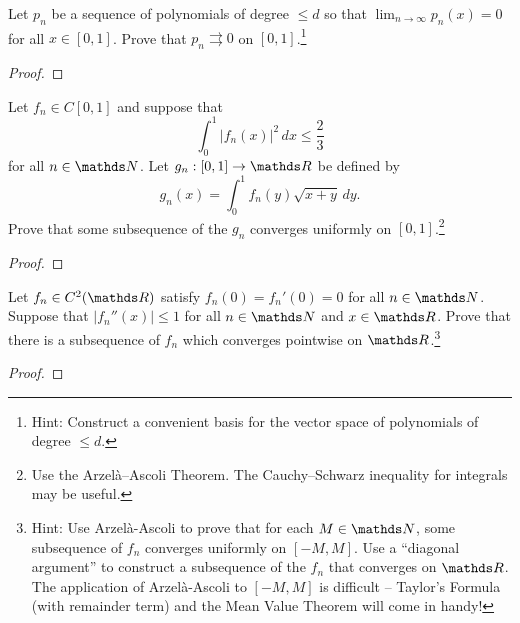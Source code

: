 \documentclass{../homework}
\date{Thursday 3/7}
\author{}
\begin{document}
\begin{Exercise}
	Let $p_n$ be a sequence of polynomials of degree $\leq d$ so that
  $\lim_{n\to\infty} p_n(x) = 0$ for all $x\in [0,1]$.  Prove that
  $p_n \rightrightarrows 0$ on $[0,1]$.\footnote{Hint: Construct a
    convenient basis for the vector space of polynomials of degree
    $\leq d$.}
\end{Exercise}
\begin{solution}
  \begin{proof}

  \end{proof}
\end{solution}

\begin{Exercise}
	Let $f_n \in C[0,1]$ and suppose that
	\begin{equation*}
		\int_0^1 |f_n(x)|^2\,dx \leq \frac{2}{3}
	\end{equation*}
	for all $n \in \N$.  Let $g_n:[0,1] \to \R$ be defined by
	\begin{equation*}
		g_n(x) = \int_0^1f_n(y)  \sqrt{x+y}\, dy.
	\end{equation*}
	Prove that some subsequence of the $g_n$ converges uniformly on
  $[0,1]$.\footnote{Use the Arzel\`a--Ascoli Theorem.  The
    Cauchy--Schwarz inequality for integrals may be useful.}
\end{Exercise}
\begin{solution}
  \begin{proof}

  \end{proof}
\end{solution}

\begin{Exercise}
	Let $f_n \in C^2(\R)$ satisfy $f_n(0) = f_n'(0) = 0$ for all
  $n \in \N$.  Suppose that $|f_n''(x)| \leq 1$ for all $n\in \N$ and
  $x \in \R$.  Prove that there is a subsequence of $f_n$ which
  converges pointwise on $\R$.\footnote{Hint: Use Arzel\`a-Ascoli to
    prove that for each $M \in \N$, some subsequence of $f_n$
    converges uniformly on $[-M,M]$.  Use a ``diagonal argument'' to
    construct a subsequence of the $f_n$ that converges on $\R$.  The
    application of Arzel\`a-Ascoli to $[-M,M]$ is difficult --
    Taylor's Formula (with remainder term) and the Mean Value Theorem
    will come in handy!}
\end{Exercise}
\begin{solution}
  \begin{proof}

  \end{proof}
\end{solution}
\end{document}
